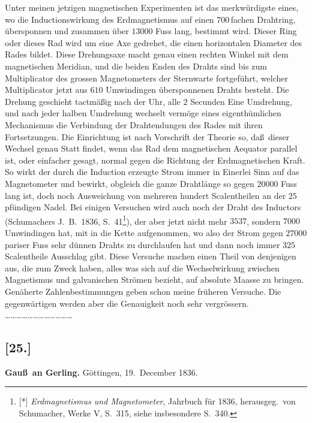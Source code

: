 \documentclass[12pt,a4paper]{article}
\theoremstyle{plain}
\theoremstyle{definition}
\theoremstyle{remark}
\begin{document}
Unter meinen jetzigen magnetischen Experimenten ist das
merkw\"urdigste eines, wo die Inductionswirkung des Erdmagnetismus
auf einen $700$\,fachen Drahtring, \"ubersponnen und zusammen \"uber
$13000$ Fuss lang, bestimmt wird. Dieser Ring oder dieses Rad wird
um eine Axe gedrehet, die einen horizontalen Diameter des Rades
bildet. Diese Drehungsaxe macht genau einen rechten Winkel mit dem
magnetischen Meridian, und die beiden Enden des Drahts sind bis zum
Multiplicator des grossen Magnetometers der Sternwarte fortgef\"uhrt,
welcher Multiplicator jetzt aus $610$ Umwindingen \"ubersponnenen
Drahts besteht. Die Drehung geschieht tactm\"a\ss ig nach der Uhr,
alle $2$ Secunden Eine Umdrehung, und nach jeder halben Umdrehung
wechselt verm\"oge eines eigenth\"umlichen Mechanismus die
Verbindung der Drahtendungen des Rades mit ihren Fortsetzungen. Die
Einrichtung ist nach Vorschrift der Theorie so, da\ss\ dieser Wechsel
genau Statt findet, wenn das Rad dem magnetischen Aequator parallel
ist, oder einfacher gesagt, normal gegen die Richtung der
Erdmagnetischen Kraft. So wirkt der durch die Induction erzeugte
Strom immer in Einerlei Sinn auf das Magnetometer und bewirkt,
obgleich die ganze Drahtl\"ange so gegen $20000$ Fuss lang ist, doch
noch Ausweichung von mehreren hundert Scalentheilen an der
$25$\,pf\"undigen Nadel. Bei einigen Versuchen wird auch noch der
Draht des Inductors ({\sc Schumachers} J.~B.~1836, S.~41\footnote{[*]
{\it Erdmagnetismus und Magnetometer}, Jahrbuch f\"ur 1836, herausgeg.~von
Schumacher, Werke V, S.~315, siehe insbesondere S.~340.}), der aber
jetzt nicht mehr $3537$, sondern $7000$ Umwindingen hat, mit in die
Kette aufgenommen, wo also der Strom gegen $27000$ pariser Fuss sehr
d\"unnen Drahts zu durchlaufen hat und dann noch immer $325$
Scalentheile Ausschlag gibt. Diese Versuche machen einen Theil von
denjenigen aus, die zum Zweck haben, alles was sich auf die
Wechselwirkung zwischen Magnetismus und galvanischen Str\"omen
bezieht, auf absolute Maasse zu bringen. Gen\"aherte
Zahlenbestimmungen geben schon meine fr\"uheren Versuche. Die
gegenw\"artigen werden aber die Genauigkeit noch sehr vergr\"ossern.
\ldots\ldots\ldots\ldots\ldots\ldots\ldots\ldots\ldots\ldots\ldots\ldots

\subsection*{[25.]}
\begin{center}
\textbf{Gau\ss\ an Gerling.} G\"ottingen, 19.~December 1836.
\end{center}
\end{document}
